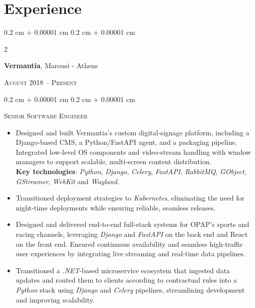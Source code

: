 \documentclass[10pt, letterpaper]{article}
\newcommand\boldblack[1]{\textcolor{strongColor}{\textbf{#1}}}
\newcommand\textscc[1]{\textcolor{sourceColor}{\textsc{#1}}}
\newenvironment{highlights}{
    \begin{itemize}[
        topsep=0.10 cm,
        parsep=0.10 cm,
        partopsep=0pt,
        itemsep=0pt,
        leftmargin=0.4 cm + 10pt
    ]
}{
    \end{itemize}
} %
\newenvironment{onecolentry}{
    \begin{adjustwidth}{
        0.2 cm + 0.00001 cm
    }{
        0.2 cm + 0.00001 cm
    }
}{
    \end{adjustwidth}
} %
\newenvironment{flextwocolentry}[2][]{
    \onecolentry
    \def\secondColumn{#2}
    \setcolumnwidth{\fill, \fill}
    \begin{paracol}{2}
}{
    \switchcolumn \raggedleft \secondColumn
    \end{paracol}
    \endonecolentry
} %
\begin{document}
    \section{Experience}
        \begin{flextwocolentry}{\textscc{August 2018 – Present}}
            \boldblack{Vermantia}, Marousi - Athens
        \end{flextwocolentry}
        \begin{onecolentry}
            \textscc{Senior Software Engineer} 
            \begin{highlights}
                \item Designed and built Vermantia’s custom digital‑signage platform, including a Django‑based CMS, a Python/FastAPI agent, and a packaging pipeline. Integrated low‑level OS components and video‑stream handling with window managers to support scalable, multi‑screen content distribution. \\ \boldblack{Key technologies}: \textit{Python}, \textit{Django}, \textit{Celery}, \textit{FastAPI}, \textit{RabbitMQ}, \textit{GObject}, \textit{GStreamer}, \textit{WebKit} and \textit{Wayland}.
                \item Transitioned deployment strategies to \textit{Kubernetes}, eliminating the need for night-time deployments while ensuring reliable, seamless releases.
                \item Designed and delivered end‑to‑end full‑stack systems for OPAP’s sports and racing channels, leveraging \textit{Django} and \textit{FastAPI} on the back end and React on the front end. Ensured continuous availability and seamless high‑traffic user experiences by integrating live streaming and real‑time data pipelines.
                \item Transitioned a \textit{.NET}‑based microservice ecosystem that ingested data updates and routed them to clients according to contractual rules into a \textit{Python} stack using \textit{Django} and \textit{Celery} pipelines, streamlining development and improving scalability.
            \end{highlights}
        \end{onecolentry}
        
\end{document}
